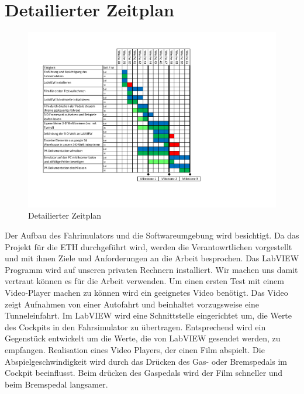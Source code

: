 \section{Detailierter Zeitplan}
\begin{figure}[H]
\centering 
\includegraphics[width=1.0\linewidth]{src/Zeitplan.pdf}
\caption{Detailierter Zeitplan} %
\label{zeitplan} %
\end{figure}
Der Aufbau des Fahrimulators und die Softwareumgebung wird besichtigt. Da das Projekt für die ETH durchgeführt wird, werden die Verantowrtlichen vorgestellt und mit ihnen Ziele und Anforderungen an die Arbeit besprochen. 
Das LabVIEW Programm wird auf unseren privaten Rechnern installiert. Wir machen uns damit vertraut können es für die Arbeit verwenden. 
Um einen ersten Test mit einem Video-Player machen zu können wird ein geeignetes Video benötigt. Das Video zeigt Aufnahmen von einer Autofahrt und beinhaltet vorzugsweise eine Tunneleinfahrt.
Im LabVIEW wird eine Schnittstelle eingerichtet um, die Werte des Cockpits in den Fahrsimulator zu übertragen. Entsprechend wird ein Gegenstück entwickelt um die Werte, die von LabVIEW gesendet werden, zu empfangen. 
Realisation eines Video Players, der einen Film abspielt. Die Abspielgeschwindigkeit wird durch das Drücken des Gas- oder Bremspedals im Cockpit beeinflusst. Beim drücken des Gaspedals wird der Film schneller und beim Bremspedal langsamer. 
